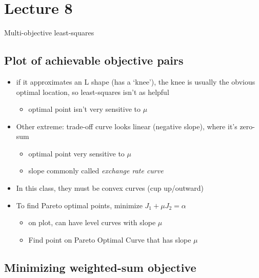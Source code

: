 \documentclass[10pt,letterpaper]{article}
\begin{document}
\section{Lecture 8}
\label{sec-6}

Multi-objective least-squares
\subsection{Plot of achievable objective pairs}
\label{sec-6_1}

\begin{itemize}
\item if it approximates an L shape (has a `knee'), the knee is usually the obvious optimal location, so least-squares isn't as helpful

\begin{itemize}
\item optimal point isn't very sensitive to $\mu$
\end{itemize}

\item Other extreme: trade-off curve looks linear (negative slope), where it's zero-sum

\begin{itemize}
\item optimal point very sensitive to $\mu$
\item slope commonly called \emph{exchange rate curve}
\end{itemize}

\item In this class, they must be convex curves (cup up/outward)
\item To find Pareto optimal points, minimize $J_1 + \mu J_2 = \alpha$

\begin{itemize}
\item on plot, can have level curves with slope $\mu$
\item Find point on Pareto Optimal Curve that has slope $\mu$
\end{itemize}

\end{itemize}
\subsection{Minimizing weighted-sum objective}
\label{sec-6_2}
\end{document}

